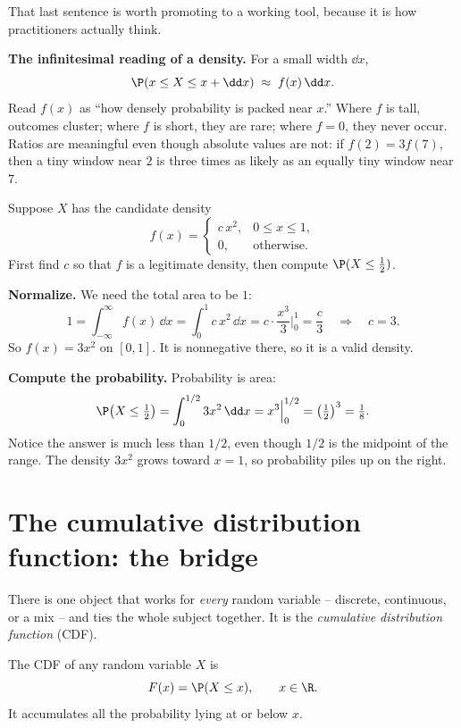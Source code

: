 That last sentence is worth promoting to a working tool, because it is how
practitioners actually think.

\begin{focusbox}
\textbf{The infinitesimal reading of a density.} For a small width $\dd x$,
\[
  \P\!\left(x \le X \le x + \dd x\right) \;\approx\; f(x)\,\dd x .
\]
Read $f(x)$ as ``how densely probability is packed near $x$.'' Where $f$ is tall,
outcomes cluster; where $f$ is short, they are rare; where $f=0$, they never occur.
Ratios are meaningful even though absolute values are not: if $f(2) = 3 f(7)$, then
a tiny window near $2$ is three times as likely as an equally tiny window near $7$.
\end{focusbox}

\begin{example}
\label{ch10:ex-quadratic}
Suppose $X$ has the candidate density
\[
  f(x) = \begin{cases} c\,x^2, & 0 \le x \le 1,\\[2pt] 0, & \text{otherwise.}\end{cases}
\]
First find $c$ so that $f$ is a legitimate density, then compute
$\P(X \le \tfrac12)$.

\textbf{Normalize.} We need the total area to be $1$:
\[
  1 = \int_{-\infty}^{\infty} f(x)\,\dd x = \int_0^1 c\,x^2 \,\dd x
    = c \cdot \frac{x^3}{3}\Big|_0^1 = \frac{c}{3}
  \quad\Longrightarrow\quad c = 3 .
\]
So $f(x) = 3x^2$ on $[0,1]$. It is nonnegative there, so it is a valid density.

\textbf{Compute the probability.} Probability is area:
\[
  \P\!\left(X \le \tfrac12\right) = \int_0^{1/2} 3x^2 \,\dd x
    = x^3 \Big|_0^{1/2} = \left(\tfrac12\right)^3 = \tfrac18 .
\]
Notice the answer is much less than $1/2$, even though $1/2$ is the midpoint of the
range. The density $3x^2$ grows toward $x=1$, so probability piles up on the right.
\end{example}

\section{The cumulative distribution function: the bridge}
\label{ch10:cdf}

There is one object that works for \emph{every} random variable -- discrete,
continuous, or a mix -- and ties the whole subject together. It is the
\emph{cumulative distribution function} (CDF).

\begin{definition}[CDF]
\label{ch10:def-cdf}
The CDF of any random variable $X$ is
\[
  F(x) = \P(X \le x), \qquad x \in \R .
\]
It accumulates all the probability lying at or below $x$.
\end{definition}

